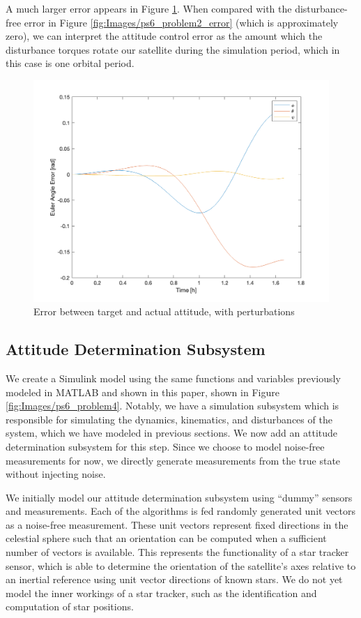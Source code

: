 A much larger error appears in Figure \ref{fig:Images/ps6_problem3_error}. When compared with the disturbance-free error in Figure \ref{fig:Images/ps6_problem2_error} (which is approximately zero), we can interpret the attitude control error as the amount which the disturbance torques rotate our satellite during the simulation period, which in this case is one orbital period.

\begin{figure}[H]
\centering
\includegraphics[scale=0.6]{Images/ps6_problem3_error.png}
\caption{Error between target and actual attitude, with perturbations}
\label{fig:Images/ps6_problem3_error}
\end{figure}

\subsection{Attitude Determination Subsystem}
We create a Simulink model using the same functions and variables previously modeled in MATLAB and shown in this paper, shown in Figure \ref{fig:Images/ps6_problem4}. Notably, we have a simulation subsystem which is responsible for simulating the dynamics, kinematics, and disturbances of the system, which we have modeled in previous sections. We now add an attitude determination subsystem for this step. Since we choose to model noise-free measurements for now, we directly generate measurements from the true state without injecting noise.

We initially model our attitude determination subsystem using ``dummy'' sensors and measurements. Each of the algorithms is fed randomly generated unit vectors as a noise-free measurement. These unit vectors represent fixed directions in the celestial sphere such that an orientation can be computed when a sufficient number of vectors is available. This represents the functionality of a star tracker sensor, which is able to determine the orientation of the satellite's axes relative to an inertial reference using unit vector directions of known stars. We do not yet model the inner workings of a star tracker, such as the identification and computation of star positions.

